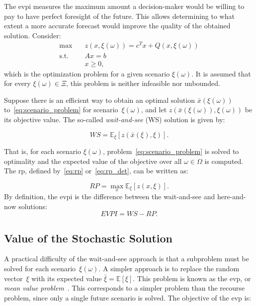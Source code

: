 The \gls{evpi} measures the maximum amount a decision-maker would be willing to
pay to have perfect foresight of the future. This allows determining to what
extent a more accurate forecast would improve the quality of the obtained
solution. Consider:
\begin{align}
	\max \quad        & z(x, \xi(\omega)) = c^{T} x + Q(x, \xi(\omega)) \nonumber \\
	\text{s.t.} \quad & A x = b \nonumber                                         \\
	                  & x \geq 0,
	\label{eq:scenario_problem}
\end{align}
which is the optimization problem for a given scenario $\xi(\omega)$. It is assumed
that for every $\xi(\omega) \in \Xi$, this problem is neither infeasible nor
unbounded.

Suppose there is an efficient way to obtain an optimal solution
$\bar{x}(\xi(\omega))$ to~\eqref{eq:scenario_problem} for
scenario~$\xi(\omega)$, and let $z(\bar{x}(\xi(\omega)), \xi(\omega))$ be its
objective value. The so-called \emph{wait-and-see} (WS) solution is given by:

\begin{equation}
	WS = \mathbb{E}_{\xi} \left[ z(\bar{x}(\xi), \xi) \right].
	\label{eq:ws}
\end{equation}

That is, for each scenario $\xi(\omega)$, problem~\eqref{eq:scenario_problem}
is solved to optimality and the expected value of the objective over all $\omega \in
	\Omega$ is computed. The \gls{rp}, defined by~\eqref{eq:rp} or~\eqref{eq:rp_det}, can be
written as:

\begin{equation}
	RP = \max_{x} \mathbb{E}_{\xi} \left[ z(x, \xi) \right].
	\label{eq:rp_exp}
\end{equation}
By definition, the \gls{evpi} is the difference between the wait-and-see and
here-and-now solutions:
\[
	EVPI = WS - RP.
\]

\subsection{Value of the Stochastic Solution}

A practical difficulty of the wait-and-see approach is that a subproblem must be
solved for each scenario~$\xi(\omega)$. A simpler approach is to replace the
random vector~$\xi$ with its expected value $\bar{\xi} = \mathbb{E}[\xi]$. This
problem is known as the \gls{evp}, or \emph{mean value
	problem}~\cite{birge:2011}. This corresponds to a simpler problem than the
recourse problem, since only a single future scenario is solved. The
objective of the \gls{evp} is:


